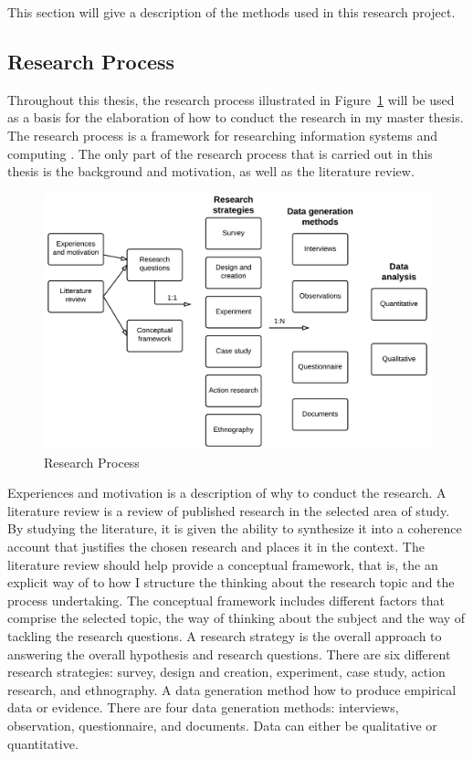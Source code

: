   This section will give a description of the methods used in this research project. 

    \subsection{Research Process} \label{sec:methodresearchprocess}

    Throughout this thesis, the research process illustrated in Figure~\ref{fig:researchProcess1} will be used as a basis for the elaboration of how to conduct the research in my master thesis. The research process is a framework for researching information systems and computing \cite{empiriske}. The only part of the research process that is carried out in this thesis is the background and motivation, as well as the literature review.

      \begin{figure}[H]
        \centering
        \includegraphics[scale=0.18]{pics/ResearchProcess.png}
        \caption[Research process]{Research Process \cite{empiriske}}
        \label{fig:researchProcess1}
      \end{figure}

    Experiences and motivation is a description of why to conduct the research. A literature review is a review of published research in the selected area of study. By studying the literature, it is given the ability to synthesize it into a coherence account that justifies the chosen research and places it in the context. The literature review should help provide a conceptual framework, that is, the an explicit way of to how I structure the thinking about the research topic and the process undertaking. The conceptual framework includes different factors that comprise the selected topic, the way of thinking about the subject and the way of tackling the research questions. A research strategy is the overall approach to answering the overall hypothesis and research questions. There are six different research strategies: survey, design and creation, experiment, case study, action research, and ethnography. A data generation method how to produce empirical data or evidence. There are four data generation methods: interviews, observation, questionnaire, and documents. Data can either be qualitative or quantitative. 

